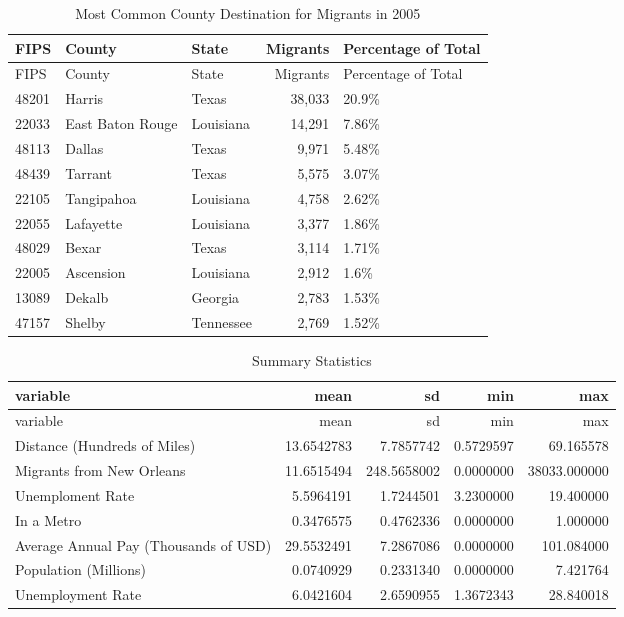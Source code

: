 \documentclass[]{article}
\begin{document}
\begin{longtable}[]{@{}lllrl@{}}
\caption{Most Common County Destination for Migrants in 2005
\label{tab:commondest}}\tabularnewline
\toprule
FIPS & County & State & Migrants & Percentage of Total\tabularnewline
\midrule
\endfirsthead
\toprule
FIPS & County & State & Migrants & Percentage of Total\tabularnewline
\midrule
\endhead
48201 & Harris & Texas & 38,033 & 20.9\%\tabularnewline
22033 & East Baton Rouge & Louisiana & 14,291 & 7.86\%\tabularnewline
48113 & Dallas & Texas & 9,971 & 5.48\%\tabularnewline
48439 & Tarrant & Texas & 5,575 & 3.07\%\tabularnewline
22105 & Tangipahoa & Louisiana & 4,758 & 2.62\%\tabularnewline
22055 & Lafayette & Louisiana & 3,377 & 1.86\%\tabularnewline
48029 & Bexar & Texas & 3,114 & 1.71\%\tabularnewline
22005 & Ascension & Louisiana & 2,912 & 1.6\%\tabularnewline
13089 & Dekalb & Georgia & 2,783 & 1.53\%\tabularnewline
47157 & Shelby & Tennessee & 2,769 & 1.52\%\tabularnewline
\bottomrule
\end{longtable}

\clearpage

\begin{longtable}[]{@{}lrrrr@{}}
\caption{Summary Statistics \label{tab:sumstats}}\tabularnewline
\toprule
variable & mean & sd & min & max\tabularnewline
\midrule
\endfirsthead
\toprule
variable & mean & sd & min & max\tabularnewline
\midrule
\endhead
Distance (Hundreds of Miles) & 13.6542783 & 7.7857742 & 0.5729597 &
69.165578\tabularnewline
Migrants from New Orleans & 11.6515494 & 248.5658002 & 0.0000000 &
38033.000000\tabularnewline
Unemploment Rate & 5.5964191 & 1.7244501 & 3.2300000 &
19.400000\tabularnewline
In a Metro & 0.3476575 & 0.4762336 & 0.0000000 & 1.000000\tabularnewline
Average Annual Pay (Thousands of USD) & 29.5532491 & 7.2867086 &
0.0000000 & 101.084000\tabularnewline
Population (Millions) & 0.0740929 & 0.2331340 & 0.0000000 &
7.421764\tabularnewline
Unemployment Rate & 6.0421604 & 2.6590955 & 1.3672343 &
28.840018\tabularnewline
\bottomrule
\end{longtable}

\clearpage

\clearpage
\scriptsize
\end{document}
